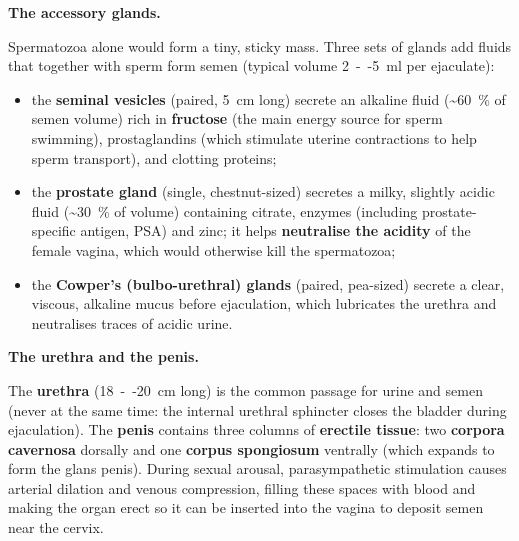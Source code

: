\documentclass[11pt]{article}
\newcommand{\cle}[1]{{\popxbold\color{popdark}#1}}
\begin{document}
\textbf{The accessory glands.}\par
Spermatozoa alone would form a tiny, sticky mass. Three sets of glands add fluids that together with sperm form \cle{semen} (typical volume \SI{2}{--}\SI{5}{ml} per ejaculate):
\begin{itemize}
\item the \textbf{seminal vesicles} (paired, \SI{5}{cm} long) secrete an alkaline fluid (\textasciitilde\SI{60}{\%} of semen volume) rich in \textbf{fructose} (the main energy source for sperm swimming), prostaglandins (which stimulate uterine contractions to help sperm transport), and clotting proteins;
\item the \textbf{prostate gland} (single, chestnut-sized) secretes a milky, slightly acidic fluid (\textasciitilde\SI{30}{\%} of volume) containing citrate, enzymes (including prostate-specific antigen, PSA) and zinc; it helps \textbf{neutralise the acidity} of the female vagina, which would otherwise kill the spermatozoa;
\item the \textbf{Cowper's (bulbo-urethral) glands} (paired, pea-sized) secrete a clear, viscous, alkaline mucus before ejaculation, which lubricates the urethra and neutralises traces of acidic urine.
\end{itemize}

\textbf{The urethra and the penis.}\par
The \textbf{urethra} (\SI{18}{--}\SI{20}{cm} long) is the common passage for urine and semen (never at the same time: the internal urethral sphincter closes the bladder during ejaculation). The \textbf{penis} contains three columns of \textbf{erectile tissue}: two \textbf{corpora cavernosa} dorsally and one \textbf{corpus spongiosum} ventrally (which expands to form the glans penis). During sexual arousal, parasympathetic stimulation causes arterial dilation and venous compression, filling these spaces with blood and making the organ erect so it can be inserted into the vagina to deposit semen near the cervix.
\end{document}
